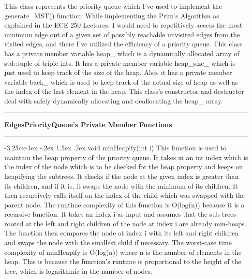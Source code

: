 \documentclass[a4paper]{article}
\makeatletter
\newcommand*{\xdash}[1][3em]{\rule[0.5ex]{#1}{0.55pt}}
\renewcommand\paragraph{\@startsection{paragraph}{4}{\z@}%
                                     {-3.25ex\@plus -1ex \@minus -.2ex}%
                                     {1.5ex \@plus .2ex}%
                                     {\normalfont\normalsize\bfseries}}
\makeatother
\begin{document}
			This class represents the priority queue which I've used to implement the {\color{draculapurple}generate\_MST}() function. 
			While implementing the Prim's Algorithm as explained in the ECE 250 Lectures, 
			I would need to repetitively access the most minimum edge out of a given set of possibly reachable unvisited edges 
			from the visited edges, and there I've utilized the efficiency of a priority queue.
			This class has a private member variable {\color{Turquoise}heap\_} which is a dynamically allocated array of 
			{\color{draculapurple}std::tuple} of triple {\color{draculapurple}int}s. It has a private member variable 
			{\color{Turquoise}heap\_size\_} which is just used to keep track of the size of the heap.
			Also, it has a private member variable {\color{Turquoise}back\_} which is used to keep track of the actual 
			size of heap as well as the index of the last element in the heap.
			This class's constructor and destructor deal with safely dynamically allocating and deallocating the 
			{\color{Turquoise}heap\_} array. 
	

			\begin{center}
				\xdash[6em] \textbf{EdgesPriorityQueue's Private Member Functions} \xdash[6em]
			\end{center}

			\paragraph{{\color{orange}void} {\color{draculapurple}minHeapify}({\color{orange}int} i)}
				This function is used to maintain the heap property of the priority queue. It takes in an {\color{orange}int} index 
				which is the index of the node which is to be checked for the heap property and keeps on heapifying the subtrees. 
				It checks if the node at the given 
				index is greater than its children, and if it is, it swaps the node with the minimum of its children. 
				It then recursively calls itself on the index of the child which was swapped with the parent node.
				The runtime complexity of this function is {\color{lightblue}O(log(n))} because it is a recursive function. 
				It takes an index i as input and assumes that the sub-trees rooted at the left and right children of the node at 
				index {\color{orange}i} are already min-heaps. The function then compares the node at index {\color{orange}i} with its 
				left and right children and swaps the node with the smallest child if necessary. The worst-case time complexity of minHeapify is 
				{\color{lightblue}O(log(n))} where n is the number of elements in the heap. This is because the function's runtime 
				is proportional to the height of the tree, which is logarithmic in the number of nodes.
			
\end{document}
